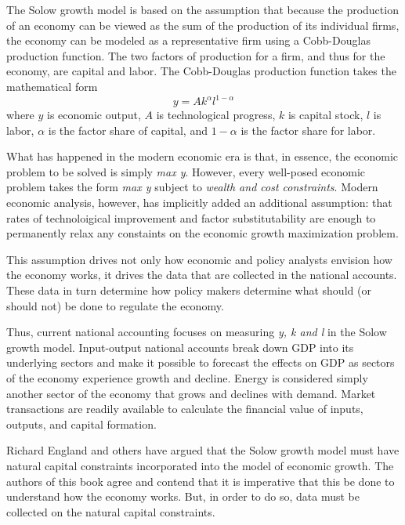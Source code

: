The Solow growth model is based on the assumption  that because the production of an economy 
can be viewed as the sum of the production of its individual firms, 
the economy can be modeled as a representative firm using
a  Cobb-Douglas 
production function. The two factors of production for a firm, and thus
for the economy, are capital and labor. The
	Cobb-Douglas production function  takes the mathematical form
	\begin{equation*}
		y = A k^{\alpha} l^{1-\alpha}
	\end{equation*}	 
	where 
	$y$ is economic output, 
	$A$ is technological progress,
	$k$ is capital stock, 
	$l$ is labor, 
	$\alpha$ is the factor share of capital, and
	$1-\alpha$ is the factor share for labor.
 
What has happened in the modern economic era is that, in essence, the economic
problem to be solved is simply \emph{max y}. 
However, every well-posed economic problem takes the form
 \emph{max y} subject to \emph{wealth and cost constraints}. 
Modern economic analysis, however, has implicitly
added an additional assumption: that 
rates of technoloigical improvement and factor substitutability are
enough to permanently relax any constaints on the economic 
growth maximization problem.

This assumption drives not only how economic and policy analysts envision
how the economy works, it drives the data that are collected in the
national accounts. These data
in turn determine how policy makers determine what
should (or should not) be done to regulate the economy.

Thus, current national accounting focuses on measuring 
 \emph{y, k and l} in the Solow growth
model. Input-output
national accounts break down GDP into its underlying sectors and
make it possible to forecast the effects on GDP as sectors of the economy
experience growth and decline. 
 Energy is considered simply another sector of the economy
that grows and declines with demand.
 Market transactions are readily available to calculate the financial value of 
inputs, outputs, and capital formation.


Richard England \cite{england2000} and others have argued that the Solow
growth model must have natural capital constraints incorporated into the model
of economic growth.
The authors of this book agree and contend that it is imperative that this be 
done to understand how the economy works. But, in order to
do so, data must be collected on the natural capital constraints.

